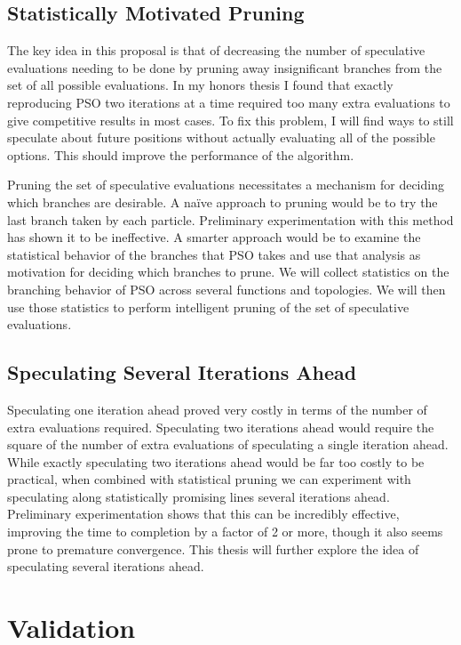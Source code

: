 \documentclass[ms]{byuprop}
\begin{document}
\subsection{Statistically Motivated Pruning}

The key idea in this proposal is that of decreasing the number of speculative
evaluations needing to be done by pruning away insignificant branches from the
set of all possible evaluations.  In my honors thesis I found that exactly
reproducing PSO two iterations at a time required too many extra evaluations to
give competitive results in most cases.  To fix this problem, I will find ways
to still speculate about future positions without actually evaluating all of
the possible options.  This should improve the performance of the algorithm.

Pruning the set of speculative evaluations necessitates a mechanism for
deciding which branches are desirable.  A na\"ive approach to pruning would be
to try the last branch taken by each particle.  Preliminary experimentation
with this method has shown it to be ineffective.  A smarter approach would be
to examine the statistical behavior of the branches that PSO takes and use that
analysis as motivation for deciding which branches to prune.  We will collect
statistics on the branching behavior of PSO across several functions and
topologies.  We will then use those statistics to perform intelligent pruning
of the set of speculative evaluations.

\subsection{Speculating Several Iterations Ahead}

Speculating one iteration ahead proved very costly in terms of the number of
extra evaluations required.  Speculating two iterations ahead would require the
square of the number of extra evaluations of speculating a single iteration
ahead.  While exactly speculating two iterations ahead would be far too costly
to be practical, when combined with statistical pruning we can experiment with
speculating along statistically promising lines several iterations ahead.
Preliminary experimentation shows that this can be incredibly effective,
improving the time to completion by a factor of 2 or more, though it also seems
prone to premature convergence.  This thesis will further explore the idea of
speculating several iterations ahead.

\section{Validation}
\end{document}
